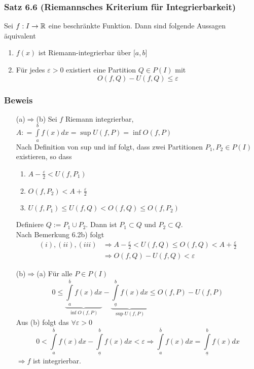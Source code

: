 \subsubsection*{Satz 6.6 (Riemannsches Kriterium für Integrierbarkeit)}
Sei $f:I\to\mathbb{R}$ eine beschränkte Funktion. Dann sind folgende Aussagen äquivalent
\begin{enumerate}[\hspace{3mm}(a)]
\item $f(x)$ ist Riemann-integrierbar über $\lbrack a,b\rbrack$
\item Für jedes $\varepsilon>0$ existiert eine Partition $Q\in P(I)$ mit \[O(f,Q)-U(f,Q)\leq\varepsilon\]
\end{enumerate}
\subsubsection*{Beweis}




\begin{enumerate}[align=left]
\item[(a)$\Rightarrow$(b)] Sei $f$ Riemann integrierbar, $A: = \int\limits_a^b {f(x)dx = \sup U(f,P) = \inf O(f,P)}$\\
Nach Definition von sup und inf folgt, dass zwei Partitionen $P_1,P_2\in P(I)$ existieren, so dass

\begin{enumerate}[\indent $(i)$]
\item $A-\frac{\varepsilon}{2}<U(f,P_1)$
\item $O(f,P_2)<A+\frac{\varepsilon}{2}$
\item $U(f,P_1) \leq U(f,Q) < O(f,Q) \leq O(f,P_2)$
\end{enumerate}

Definiere $Q:=P_1\cup P_2$. Dann ist $P_1\subset Q$ und $P_2 \subset Q$.\\
Nach Bemerkung 6.2b) folgt
\begin{align*}
(i),(ii),(iii)&\Rightarrow A-\frac{\varepsilon}{2}<U(f,Q)\leq O(f,Q)<A+\frac{\varepsilon}{2}\\
&\Rightarrow O(f,Q)-U(f,Q) < \varepsilon
\end{align*}
\item[(b)$\Rightarrow$(a)] Für alle $P\in P(I)$ \[0 \le \underbrace {\int\limits_{a}^{\overline{b}} {f(x)dx} }_{\inf O(f,P)} - \underbrace {\int\limits_{\underline{a}}^{{b}} {f(x)dx} }_{\sup U(f,P)} \le O(f,P) - U(f,P)\]
Aus (b) folgt das $\forall\varepsilon>0$ \[0 < \int\limits_a^{\overline{b}} {f(x)dx - \int\limits_{\underline{a}}^b {f(x)dx < \varepsilon } } \Rightarrow \int\limits_a^{\overline{b}} {f(x)dx = \int\limits_{\underline{a}}^b {f(x)dx} } \] $\Rightarrow f$ ist integrierbar.
\end{enumerate}

